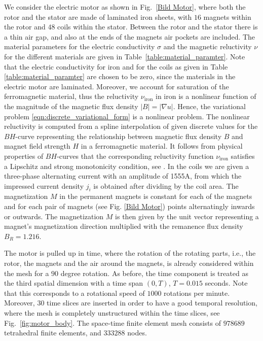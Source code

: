 \documentclass[12pt]{article}
\numberwithin{equation}{section}
\begin{document}
We consider the electric motor as shown in Fig.~\ref{Bild Motor}, where both
the rotor and the stator are made of laminated iron sheets, with $16$ magnets within the rotor
and $48$ coils within the stator. Between the rotor and the stator there is a
thin air gap, and also at the ends of the magnets air pockets are included.
The material parameters for the electric conductivity $\sigma$ and the magnetic reluctivity $\nu$ for the different materials are given in Table~\ref{table:material_paramter}. Note that the electric conductivity for iron and for the coils as given in Table \ref{table:material_paramter} are
chosen to be zero, since the materials in the electric motor are laminated.
Moreover, we account for saturation of the ferromagnetic material, thus the reluctivity $\nu_{\text{iron}}$ in iron is a nonlinear function of the magnitude of the magnetic flux density $|B| = |\nabla u|$. Hence, the variational problem
\eqref{eqn:discrete_variational_form} is a nonlinear problem.
The nonlinear reluctivity is computed from a spline interpolation of
given discrete values for the $BH$-curve representing the relationship between magnetic flux density $B$ and magnet field strength $H$ in a ferromagnetic material. It follows from physical properties of $BH$-curves that the corresponding reluctivity function $\nu_{\text{iron}}$ satisfies a Lipschitz and strong monotonicity condition, see \cite{PechsteinJuettler2006}.
In the coils we are given a three-phase alternating current with an amplitude of 1555A, from which the impressed current density $j_i$ is obtained after dividing by the coil area. The magnetization $M$ in the permanent magnets is constant for each of the magnets and for each pair of magnets (see Fig. \ref{Bild Motor}) points alternatingly inwards or outwards. The magnetization $M$ is then given by the unit vector representing a magnet's magnetization direction multiplied with the remanence flux density $B_R = 1.216$.

The motor is pulled up in time, where the rotation of the rotating parts,
i.e., the rotor, the magnets and the air around the magnets, is already
considered within the mesh for a $90$ degree rotation. As before, the time
component is treated as the third spatial dimension with a time span
$(0,T)$, $T=0.015$ seconds. Note that this corresponds to a rotational
speed of $1000$ rotations per minute. Moreover, $30$ time slices are
inserted in order to have a good temporal resolution, where the mesh is
completely unstructured within the time slices, see Fig.~\ref{fig:motor_body}.
The space-time finite element mesh consists of $978 689$ tetrahedral
finite elements, and $333 288$ nodes.
\end{document}
